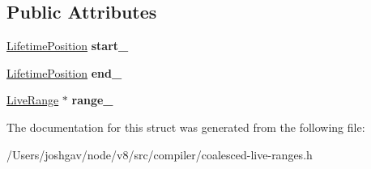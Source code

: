 \subsection*{Public Attributes}
\begin{DoxyCompactItemize}
\item 
\hyperlink{classv8_1_1internal_1_1compiler_1_1_lifetime_position}{Lifetime\+Position} {\bfseries start\+\_\+}\hypertarget{structv8_1_1internal_1_1compiler_1_1_allocated_interval_a50322de66a9eee09efcf89c53a3fc224}{}\label{structv8_1_1internal_1_1compiler_1_1_allocated_interval_a50322de66a9eee09efcf89c53a3fc224}

\item 
\hyperlink{classv8_1_1internal_1_1compiler_1_1_lifetime_position}{Lifetime\+Position} {\bfseries end\+\_\+}\hypertarget{structv8_1_1internal_1_1compiler_1_1_allocated_interval_ad20b71681736c733dc69b1aac1f702b8}{}\label{structv8_1_1internal_1_1compiler_1_1_allocated_interval_ad20b71681736c733dc69b1aac1f702b8}

\item 
\hyperlink{classv8_1_1internal_1_1compiler_1_1_live_range}{Live\+Range} $\ast$ {\bfseries range\+\_\+}\hypertarget{structv8_1_1internal_1_1compiler_1_1_allocated_interval_a69abbbd196f1c8422350540d4fc33c0c}{}\label{structv8_1_1internal_1_1compiler_1_1_allocated_interval_a69abbbd196f1c8422350540d4fc33c0c}

\end{DoxyCompactItemize}


The documentation for this struct was generated from the following file\+:\begin{DoxyCompactItemize}
\item 
/\+Users/joshgav/node/v8/src/compiler/coalesced-\/live-\/ranges.\+h\end{DoxyCompactItemize}

